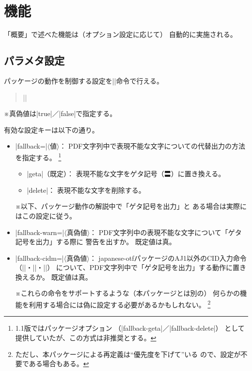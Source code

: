 \documentclass[uplatex,dvipdfmx,a4paper]{jsarticle}
\renewcommand{\headfont}{\gtfamily\romanseries{sbc}\sffamily}
\newcommand{\Pkg}[1]{\textsf{#1}}
\newcommand{\Meta}[1]{$\langle$\mbox{}#1\mbox{}$\rangle$}
\newcommand{\Note}{\par\noindent ※}
\newcommand{\Means}{：\quad}
\newcommand{\／}{\mbox{}／\mbox{}}
\providecommand{\Strong}[1]{{\headfont#1}}
\begin{document}
\section{機能}

「概要」で述べた機能は（オプション設定に応じて）
自動的に実施される。

\subsection{パラメタ設定}
\label{ssec:setup}

パッケージの動作を制御する設定を|\pxjahypersetup|命令で行える。

\begin{quote}\small
|\pxjahypersetup{|\Meta{キー}|=|\Meta{値}|,...}|
\end{quote}
\Note 真偽値は|true|\／|false|で指定する。

有効な設定キーは以下の通り。

\begin{itemize}
\item |fallback=|\Meta{値}\Means
  PDF文字列中で表現不能な文字についての代替出力の方法を指定する。
  \footnote{1.1版ではパッケージオプション
    （|fallback-geta|／|fallback-delete|）
    として提供していたが、この方式は\Strong{非推奨}とする。}
  \begin{itemize}
  \item |geta|（既定）\Means
    表現不能な文字をゲタ記号（〓）に置き換える。
  \item |delete|\Means
    表現不能な文字を削除する。
  \end{itemize}
  \Note 以下、パッケージ動作の解説中で「ゲタ記号を出力」と
    ある場合は実際にはこの設定に従う。
\item |fallback-warn=|\Meta{真偽値}\Means
  PDF文字列中の表現不能な文字について「ゲタ記号を出力」する際に
  警告を出すか。
  既定値は真。
\item |fallback-cidm=|\Meta{真偽値}\Means
  \Pkg{japanese-otf}パッケージのAJ1\Strong{以外}のCID入力命令
  （|\CIDC|・|\CIDK|・|\CIDT|）
  について、PDF文字列中で「ゲタ記号を出力」する動作に置き換えるか。
  既定値は真。
  \Note これらの命令をサポートするような（本パッケージとは別の）
  何らかの機能を利用する場合には偽に設定する必要があるかもしれない。
  \footnote{ただし、本パッケージによる再定義は“優先度を下げて”いる
    ので、設定が不要である場合もある。}
\end{itemize}
\end{document}
